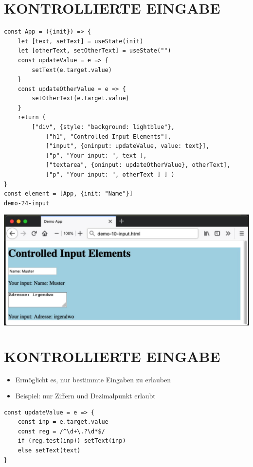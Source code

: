 \documentclass[10pt]{article}
\begin{document}
\section*{KONTROLLIERTE EINGABE}
\begin{verbatim}
const App = ({init}) => {
    let [text, setText] = useState(init)
    let [otherText, setOtherText] = useState("")
    const updateValue = e => {
        setText(e.target.value)
    }
    const updateOtherValue = e => {
        setOtherText(e.target.value)
    }
    return (
        ["div", {style: "background: lightblue"},
            ["h1", "Controlled Input Elements"],
            ["input", {oninput: updateValue, value: text}],
            ["p", "Your input: ", text ],
            ["textarea", {oninput: updateOtherValue}, otherText],
            ["p", "Your input: ", otherText ] ] )
}
const element = [App, {init: "Name"}]
demo-24-input
\end{verbatim}

\begin{center}
\includegraphics[width=\linewidth]{images/2025_01_02_a730400f36f38fd94791g-17}
\end{center}

\section*{KONTROLLIERTE EINGABE}
\begin{itemize}
  \item Ermöglicht es, nur bestimmte Eingaben zu erlauben
  \item Beispiel: nur Ziffern und Dezimalpunkt erlaubt
\end{itemize}

\begin{verbatim}
const updateValue = e => {
    const inp = e.target.value
    const reg = /^\d+\.?\d*$/
    if (reg.test(inp)) setText(inp)
    else setText(text)
}
\end{verbatim}
\end{document}
